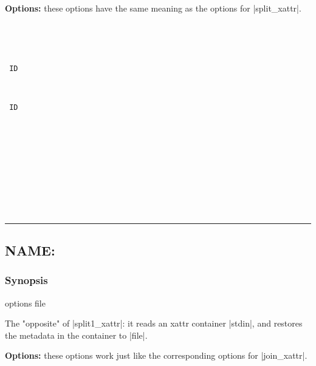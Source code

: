 \documentclass[11pt]{article}
\def\sepline{\begin{center}\rule{5in}{1pt}\end{center}}
\newcommand\BackSlash{\char92}
\newcommand\LeftBrace{\char123}
\newcommand\RightBrace{\char125}
\newenvironment{Quote}{\let\\\BackSlash\let\{\LeftBrace\let\}\RightBrace}{}
\begin{document}
\medbreak
{\bf Options:} these options have the same meaning as the
options for |split_xattr|.
\begin{description}
\item[{\tt {}}]  \ \\[-3ex]
\item[{\tt {}}]  \ \\[-3ex]
\item[{\tt{} ID}] \ \\[-3ex]
\item[{\tt{} ID}] \ \\[-3ex]
\item[{\tt{}}] \ \\[-3ex]
\item[{\tt{}}] \ \\[-3ex]
\item[{\tt{}}] \ \\[-3ex]
\item[{\tt {}}]  \ \\[-3ex]
\item[{\tt {}}] 
\end{description}


\sepline


\subsection*{NAME: \tt{}}

\subsubsection*{Synopsis}

\begin{Quote}
\begin{Vrb}
    options file
\end{Vrb}
\end{Quote}



The "opposite" of |split1_xattr|:  
it reads an xattr container |stdin|,
and restores the metadata in the
container to |file|.

\medbreak
{\bf Options:} these options work just like the
corresponding options for |join_xattr|.
\end{document}
